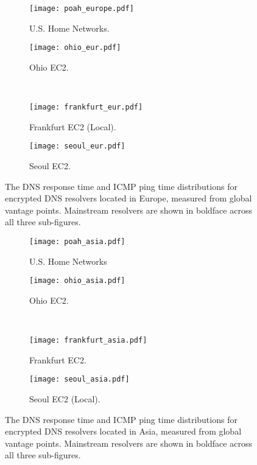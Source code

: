 \begin{figure*}[h!]
\centering
%
\begin{subfigure}[b]{0.4\textwidth}
\texttt{[image: poah\_europe.pdf]}
\caption{U.S. Home Networks.}
\end{subfigure}
%
\begin{subfigure}[b]{0.4\textwidth}
\texttt{[image: ohio\_eur.pdf]}
\caption{Ohio EC2.}
\end{subfigure}
%
\hfill \\
\begin{subfigure}[b]{0.4\textwidth}
\texttt{[image: frankfurt\_eur.pdf]}
    \caption{Frankfurt EC2 (Local).}
\end{subfigure}
%
\begin{subfigure}[b]{0.4\textwidth}
\texttt{[image: seoul\_eur.pdf]}
\caption{Seoul EC2.}
\end{subfigure}
\caption{The DNS response time and ICMP ping time distributions for
    encrypted DNS resolvers located in Europe, measured from global vantage points.
    Mainstream resolvers are shown in boldface across all three
    sub-figures.}
\label{fig:dns-europe}
\end{figure*}
\begin{figure*}[h!]
\centering
%
\begin{subfigure}[b]{0.4\textwidth}
\texttt{[image: poah\_asia.pdf]}
\caption{U.S. Home Networks}
\end{subfigure}
%
\begin{subfigure}[b]{0.4\textwidth}
\texttt{[image: ohio\_asia.pdf]}
\caption{Ohio EC2.}
\end{subfigure}
%
\hfill \\
\begin{subfigure}[b]{0.4\textwidth}
\texttt{[image: frankfurt\_asia.pdf]}
    \caption{Frankfurt EC2.}
\end{subfigure}
%
\begin{subfigure}[b]{0.4\textwidth}
\texttt{[image: seoul\_asia.pdf]}
    \caption{Seoul EC2 (Local).}
\end{subfigure}
\caption{The DNS response time and ICMP ping time distributions for
    encrypted DNS resolvers located in Asia, measured from global vantage points.
    Mainstream resolvers are shown in boldface across all three
    sub-figures.}
\label{fig:dns-asia}
\end{figure*}
